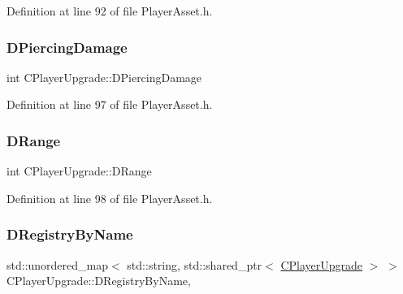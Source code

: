 Definition at line 92 of file Player\+Asset.\+h.

\hypertarget{classCPlayerUpgrade_a295d68f988ae198c66d96793824ca332}{}\label{classCPlayerUpgrade_a295d68f988ae198c66d96793824ca332} 
\subsubsection{\texorpdfstring{D\+Piercing\+Damage}{DPiercingDamage}}
{\footnotesize\ttfamily int C\+Player\+Upgrade\+::\+D\+Piercing\+Damage\hspace{0.3cm}{\ttfamily [protected]}}



Definition at line 97 of file Player\+Asset.\+h.

\hypertarget{classCPlayerUpgrade_a88aff53c9fb5d3bddfd69d1aced8dbaf}{}\label{classCPlayerUpgrade_a88aff53c9fb5d3bddfd69d1aced8dbaf} 
\subsubsection{\texorpdfstring{D\+Range}{DRange}}
{\footnotesize\ttfamily int C\+Player\+Upgrade\+::\+D\+Range\hspace{0.3cm}{\ttfamily [protected]}}



Definition at line 98 of file Player\+Asset.\+h.

\hypertarget{classCPlayerUpgrade_a33e022bd67ce2f4d9ce83dfd0b7289f6}{}\label{classCPlayerUpgrade_a33e022bd67ce2f4d9ce83dfd0b7289f6} 
\subsubsection{\texorpdfstring{D\+Registry\+By\+Name}{DRegistryByName}}
{\footnotesize\ttfamily std\+::unordered\+\_\+map$<$ std\+::string, std\+::shared\+\_\+ptr$<$ \hyperlink{classCPlayerUpgrade}{C\+Player\+Upgrade} $>$ $>$ C\+Player\+Upgrade\+::\+D\+Registry\+By\+Name\hspace{0.3cm}{\ttfamily [static]}, {\ttfamily [protected]}}




